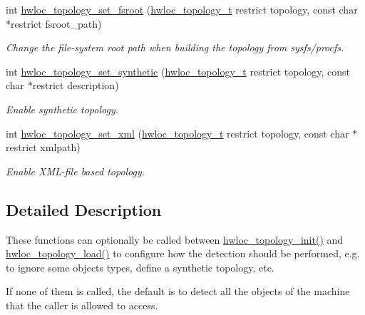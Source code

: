 \begin{CompactItemize}
int \hyperlink{group__hwlocality__configuration_g45a6b5dd59be36879a64a7f73e0363c2}{hwloc\_\-topology\_\-set\_\-fsroot} (\hyperlink{group__hwlocality__topology_g9d1e76ee15a7dee158b786c30b6a6e38}{hwloc\_\-topology\_\-t} restrict topology, const char $\ast$restrict fsroot\_\-path)
\begin{CompactList}\small\item\em Change the file-system root path when building the topology from sysfs/procfs. \item\end{CompactList}\item 
int \hyperlink{group__hwlocality__configuration_g5c11f6e454ebd5f4089670269e097a1e}{hwloc\_\-topology\_\-set\_\-synthetic} (\hyperlink{group__hwlocality__topology_g9d1e76ee15a7dee158b786c30b6a6e38}{hwloc\_\-topology\_\-t} restrict topology, const char $\ast$restrict description)
\begin{CompactList}\small\item\em Enable synthetic topology. \item\end{CompactList}\item 
int \hyperlink{group__hwlocality__configuration_g29b8ebec1b85b324af18fdf5040806bf}{hwloc\_\-topology\_\-set\_\-xml} (\hyperlink{group__hwlocality__topology_g9d1e76ee15a7dee158b786c30b6a6e38}{hwloc\_\-topology\_\-t} restrict topology, const char $\ast$restrict xmlpath)
\begin{CompactList}\small\item\em Enable XML-file based topology. \item\end{CompactList}\end{CompactItemize}


\subsection{Detailed Description}
These functions can optionally be called between \hyperlink{group__hwlocality__creation_g03fd4a16d8b9ee1ffc32b25fd2f6bdfa}{hwloc\_\-topology\_\-init()} and \hyperlink{group__hwlocality__creation_gbdf58d87ad77f6615fccdfe0535ff826}{hwloc\_\-topology\_\-load()} to configure how the detection should be performed, e.g. to ignore some objects types, define a synthetic topology, etc.

If none of them is called, the default is to detect all the objects of the machine that the caller is allowed to access. 

